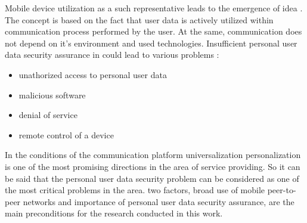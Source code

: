 %
Mobile device utilization as a such representative leads to the emergence of  idea . 
%
The  concept is based on the fact that user data is actively utilized within communication process performed by the user. 
%
At the same, communication does not depend on it's environment and used technologies. 
%
Insufficient personal user data security assurance in could lead to various problems :
\begin{itemize}
	\item unathorized access to personal user data
	\item malicious software 
	\item denial of service
	\item remote control of a device
\end{itemize}

%
In the conditions of the communication platform universalization personalization is one of the most promising directions in the area of service providing. 
%
So it can be said that the personal user data security problem can be considered as one of the most critical problems in the area. 
%
\The two factors, broad use of mobile peer-to-peer networks and importance of personal user data security assurance, are the main preconditions for the research conducted in this work. 